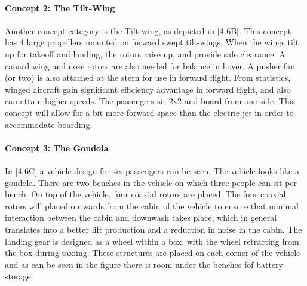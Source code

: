 \paragraph{Concept 2: The Tilt-Wing}
Another concept category is the Tilt-wing, as depicted in \autoref{4-6B}. This concept has 4 large propellers mounted on forward swept tilt-wings. When the wings tilt up for takeoff and landing, the rotors raise up, and provide safe clearance. A canard wing and nose rotors are also needed for balance in hover. A pusher fan (or two) is also attached at the stern for use in forward flight. From statistics, winged aircraft gain significant efficiency advantage in forward flight, and also can attain higher speeds. The passengers sit 2x2 and board from one side. This concept will allow for a bit more forward space than the electric jet in order to accommodate boarding.

\paragraph{Concept 3: The Gondola}
In \autoref{4-6C} a vehicle design for six passengers can be seen. The vehicle looks like a gondola. There are two benches in the vehicle on which three people can sit per bench. On top of the vehicle, four coaxial rotors are placed. The four coaxial rotors will placed outwards from the cabin of the vehicle to ensure that minimal interaction between the cabin and downwash takes place, which in general translates into a better lift production and a reduction in noise in the cabin. The landing gear is designed as a wheel within a box, with the wheel retracting from the box during taxiing. These structures are placed on each corner of the vehicle and as can be seen in the figure there is room under the benches fof battery storage. 


